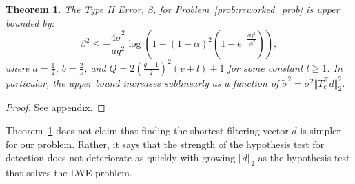 \documentclass[journal, twoside, web]{ieeecolorpreprint}
\newtheorem{thm}{Theorem}
\begin{document}
\begin{thm}\label{thm:bounds}
    The Type II Error, $\beta$, for Problem~\ref{prob:reworked_prob} is upper bounded by:
    \begin{equation}\label{eq:thm2_eq_statement}
        \beta^2 \leq -\frac{ 4 \tilde \sigma^2}{a q^2} \log \left (1- \left (1-\alpha \right)^2 \left (1-\mathrm{e}^{-\frac{b Q^2}{ 4 \tilde \sigma^2}} \right ) \right),
    \end{equation}
   where $a=\frac{1}{2}$, $b=\frac{2}{\pi}$, and $Q=2\left (\frac{q-1}{2}\right )^2(v+l)+1$ for some constant $l\geq 1$. In particular, the upper bound increases sublinearly as a function of $\tilde \sigma^2=\sigma^2 \Vert T_c^\top d \Vert_2^2$. %
\end{thm}
\begin{proof}
See appendix.
\end{proof}

Theorem~\ref{thm:bounds} does not claim that finding the shortest filtering vector $d$ is simpler for our problem. Rather, it says that the strength of the hypothesis test for detection does not deteriorate as quickly with growing $\Vert d\Vert_2$ as the hypothesis test that solves the LWE problem.
\end{document}
